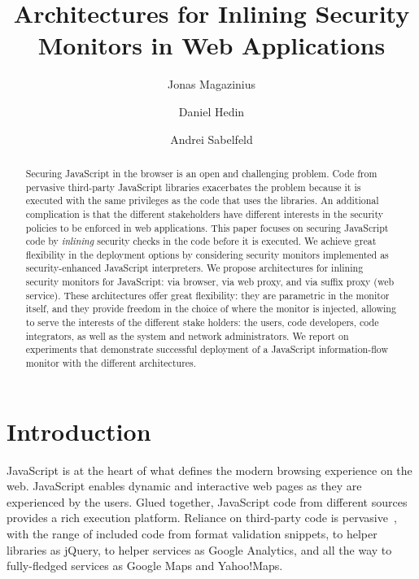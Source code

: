 \documentclass{llncs}
\title{Architectures for Inlining Security Monitors in Web Applications}
\author{Jonas Magazinius \and Daniel Hedin \and Andrei Sabelfeld}
\institute{Chalmers University of Technology, Gothenburg, Sweden}
\begin{document}
\maketitle

\thispagestyle{plain}

\begin{abstract}
Securing JavaScript in the browser is an open and challenging
problem. Code from pervasive third-party JavaScript libraries exacerbates the
problem because it is executed with the same privileges as the code
that uses the libraries.
%
An additional complication is that the different stakeholders have
different interests in the security policies to be enforced
in web applications.
%
This paper focuses on securing JavaScript code by \emph{inlining}
security checks in the code before it is executed.
%
We achieve great flexibility in the deployment options by considering
security monitors implemented as security-enhanced JavaScript interpreters.
%
We propose architectures for inlining security monitors for JavaScript: via
browser, via web proxy, and via suffix proxy (web service). 
%
These architectures offer great flexibility: they are parametric in the monitor itself,
and they provide freedom in the choice of where the monitor is
injected, allowing to serve the interests of the different stake
holders: the users, code developers, code
integrators, as well as the system and network administrators.
%
We report on experiments that demonstrate successful deployment of a JavaScript
information-flow monitor with the different architectures.
\end{abstract}










\section{Introduction}
\label{sec:intro}
JavaScript is at the heart of what defines the modern
browsing experience on the web. JavaScript enables dynamic and interactive
web pages as they are experienced by the users. Glued together,
JavaScript code from different sources provides
a rich execution platform. Reliance on third-party code is
pervasive~\cite{Nikiforakis+:CCS12}, with the range of included code from
format validation snippets, to helper
libraries as jQuery, to helper services as Google Analytics, and all the way to fully-fledged services as
Google Maps and Yahoo!\@ Maps.
\end{document}
